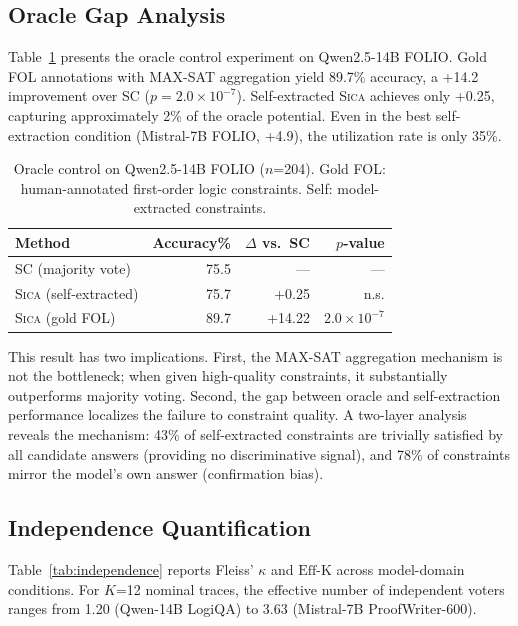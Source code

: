 \documentclass[11pt,a4paper]{article}
\newcommand{\sica}{\textsc{Sica}}
\newcommand{\effk}{\text{Eff-K}}
\newcommand{\pp}{\text{pp}}
\begin{document}
\subsection{Oracle Gap Analysis}

Table~\ref{tab:oracle} presents the oracle control experiment on Qwen2.5-14B FOLIO.
Gold FOL annotations with MAX-SAT aggregation yield 89.7\% accuracy, a +14.2\pp{} improvement over SC ($p = 2.0 \times 10^{-7}$).
Self-extracted \sica{} achieves only +0.25\pp{}, capturing approximately 2\% of the oracle potential.
Even in the best self-extraction condition (Mistral-7B FOLIO, +4.9\pp{}), the utilization rate is only 35\%.

\begin{table}[t]
\centering
\caption{Oracle control on Qwen2.5-14B FOLIO ($n$=204). Gold FOL: human-annotated first-order logic constraints. Self: model-extracted constraints.}
\label{tab:oracle}
\small
\begin{tabular}{lrrr}
\toprule
Method & Accuracy\% & $\Delta$ vs.\ SC & $p$-value \\
\midrule
SC (majority vote) & 75.5 & --- & --- \\
\sica{} (self-extracted) & 75.7 & +0.25\pp{} & n.s. \\
\sica{} (gold FOL) & 89.7 & +14.22\pp{} & $2.0 \times 10^{-7}$ \\
\bottomrule
\end{tabular}
\end{table}

This result has two implications.
First, the MAX-SAT aggregation mechanism is not the bottleneck; when given high-quality constraints, it substantially outperforms majority voting.
Second, the gap between oracle and self-extraction performance localizes the failure to constraint quality.
A two-layer analysis reveals the mechanism: 43\% of self-extracted constraints are trivially satisfied by all candidate answers (providing no discriminative signal), and 78\% of constraints mirror the model's own answer (confirmation bias).

\subsection{Independence Quantification}

Table~\ref{tab:independence} reports Fleiss' $\kappa$ and $\effk{}$ across model-domain conditions.
For $K$=12 nominal traces, the effective number of independent voters ranges from 1.20 (Qwen-14B LogiQA) to 3.63 (Mistral-7B ProofWriter-600).
\end{document}
